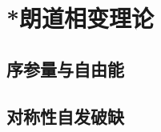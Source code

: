 

\section{*朗道相变理论}\label{13-3}

\subsection{序参量与自由能}\label{13-3-1}

\subsection{对称性自发破缺}\label{13-3-2}
